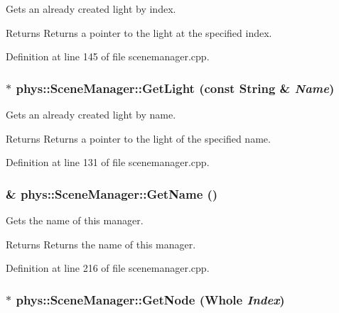 Gets an already created light by index. 

\begin{DoxyReturn}{Returns}
Returns a pointer to the light at the specified index. 
\end{DoxyReturn}


Definition at line 145 of file scenemanager.cpp.

\hypertarget{classphys_1_1SceneManager_a9cad3a29d1d3664ab42e99141142eb59}{
\subsubsection[{GetLight}]{ $\ast$ phys::SceneManager::GetLight (const {\bf String} \& {\em Name})}}
\label{dd/da8/classphys_1_1SceneManager_a9cad3a29d1d3664ab42e99141142eb59}


Gets an already created light by name. 

\begin{DoxyReturn}{Returns}
Returns a pointer to the light of the specified name. 
\end{DoxyReturn}


Definition at line 131 of file scenemanager.cpp.

\hypertarget{classphys_1_1SceneManager_ab06d592af9c696d835f216963038dbc2}{
\subsubsection[{GetName}]{ \& phys::SceneManager::GetName ()}}
\label{dd/da8/classphys_1_1SceneManager_ab06d592af9c696d835f216963038dbc2}


Gets the name of this manager. 

\begin{DoxyReturn}{Returns}
Returns the name of this manager. 
\end{DoxyReturn}


Definition at line 216 of file scenemanager.cpp.

\hypertarget{classphys_1_1SceneManager_a4b05a304bae8f187fa2474abe7b7f05f}{
\subsubsection[{GetNode}]{ $\ast$ phys::SceneManager::GetNode ({\bf Whole} {\em Index})}}
\label{dd/da8/classphys_1_1SceneManager_a4b05a304bae8f187fa2474abe7b7f05f}


